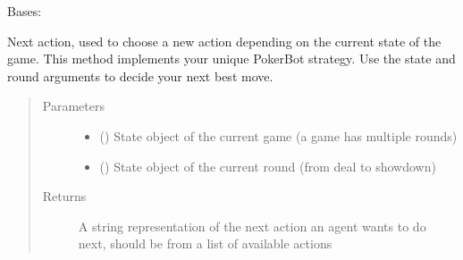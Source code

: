 \documentclass[letterpaper,10pt,english]{sphinxmanual}
\begin{document}
\begin{fulllineitems}
\label{\detokenize{agent:agent.PokerAgent}}
\pysigstartsignatures
{}
\pysigstopsignatures
\sphinxAtStartPar
Bases: 

\begin{fulllineitems}
\label{\detokenize{agent:agent.PokerAgent.make_action}}
\pysigstartsignatures
{}
\pysigstopsignatures
\sphinxAtStartPar
Next action, used to choose a new action depending on the current state of the game. This method implements your
unique PokerBot strategy. Use the state and round arguments to decide your next best move.
\begin{quote}\begin{description}
\item[{Parameters}] \leavevmode\begin{itemize}
\item {} 
\sphinxAtStartPar
{} ({\hyperref[\detokenize{client:client.state.ClientGameState}]{}}) \textendash{} State object of the current game (a game has multiple rounds)

\item {} 
\sphinxAtStartPar
{} ({\hyperref[\detokenize{client:client.state.ClientGameRoundState}]{}}) \textendash{} State object of the current round (from deal to showdown)

\end{itemize}

\item[{Returns}] \leavevmode
\sphinxAtStartPar
A string representation of the next action an agent wants to do next, should be from a list of available actions


\end{description}
\end{quote}
\end{fulllineitems}
\end{fulllineitems}
\end{document}
